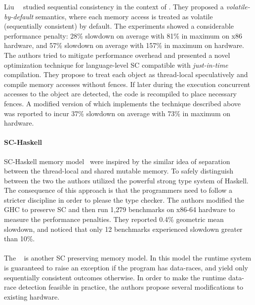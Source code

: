 Liu~\etal~\cite{Liu-al:OOPSLA17, Liu-al:PLDI19} studied 
sequential consistency in the context of \Java.  
They proposed a \emph{volatile-by-default} semantics,
where each memory access is treated as volatile 
(\ie sequentially consistent) by default. 
The experiments showed a considerable performance penalty:
28\% slowdown on average with 81\% in maximum on x86 hardware,
and 57\% slowdown on average with 157\% in maximum on  hardware.
The authors tried to mitigate performance overhead and presented  
a novel optimization technique for language-level SC
compatible with \emph{just-in-time} compilation. 
They propose to treat each object as thread-local speculatively 
and compile memory accesses without fences. 
If later during the execution concurrent accesses to the object  
are detected, the code is recompiled to place necessary fences.
A modified version of \JVM which implements the technique
described above was reported to incur 37\% slowdown on average 
with 73\% in maximum on  hardware.

\paragraph{SC-Haskell}

SC-Haskell memory model~\cite{Vollmer-al:PPoPP17}
were inspired by the similar idea of separation
between the thread-local and shared mutable memory. 
To safely distinguish between the two 
the authors utilized the powerful strong type system of Haskell. 
The consequence of this approach is that the 
programmers need to follow a stricter discipline 
in order to please the type checker. 
The authors modified the GHC to preserve SC 
and then run 1,279 benchmarks on x86-64 hardware
to measure the performance penalties.
They reported 0.4\% geometric mean slowdown,
and noticed that only 12 benchmarks experienced 
slowdown greater than 10\%.

\paragraph{\DRFx}

The \DRFx~\cite{Marino-al:PLDI10} is another 
SC preserving memory model. In this model
the runtime system is guaranteed to raise 
an exception if the program has data-races, 
and yield only sequentially consistent outcomes otherwise.
In order to make the runtime data-race detection feasible 
in practice, the authors propose several modifications 
to existing hardware.

